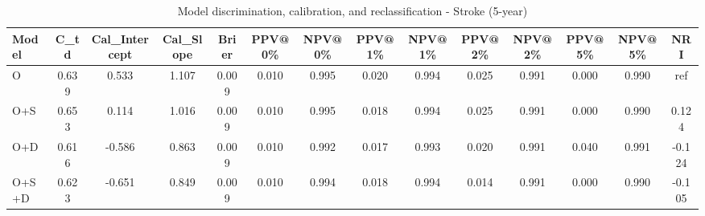 \begin{table}[htbp]
\centering
\small
\caption{Model discrimination, calibration, and reclassification - Stroke (5-year)}
\label{tab:perf_stroke_5y}
\begin{tabular}{lccccccccccccc}
\toprule
Model & C\_td & Cal\_Intercept & Cal\_Slope & Brier & PPV@0\% & NPV@0\% & PPV@1\% & NPV@1\% & PPV@2\% & NPV@2\% & PPV@5\% & NPV@5\% & NRI \\
\midrule
O & 0.639 & 0.533 & 1.107 & 0.009 & 0.010 & 0.995 & 0.020 & 0.994 & 0.025 & 0.991 & 0.000 & 0.990 & ref \\
O+S & 0.653 & 0.114 & 1.016 & 0.009 & 0.010 & 0.995 & 0.018 & 0.994 & 0.025 & 0.991 & 0.000 & 0.990 & 0.124 \\
O+D & 0.616 & -0.586 & 0.863 & 0.009 & 0.010 & 0.992 & 0.017 & 0.993 & 0.020 & 0.991 & 0.040 & 0.991 & -0.124 \\
O+S+D & 0.623 & -0.651 & 0.849 & 0.009 & 0.010 & 0.994 & 0.018 & 0.994 & 0.014 & 0.991 & 0.000 & 0.990 & -0.105 \\
\bottomrule
\end{tabular}
\end{table}